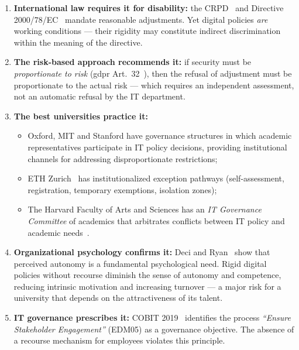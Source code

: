 \begin{enumerate}
    \item \textbf{International law requires it for disability:}
    the CRPD~\cite{un-crpd} and Directive 2000/78/EC~\cite{directive-2000-78}
    mandate reasonable adjustments. Yet digital policies
    \emph{are} working conditions --- their rigidity may constitute
    indirect discrimination within the meaning of the directive.

    \item \textbf{The risk-based approach recommends it:}
    if security must be \emph{proportionate to risk}
    (\gls{gdpr} Art.~32~\cite{gdpr}), then the refusal of adjustment must be
    proportionate to the actual risk --- which requires an independent
    assessment, not an automatic refusal by the IT department.

    \item \textbf{The best universities practice it:}
    \begin{itemize}[nosep]
        \item Oxford, MIT and Stanford have governance structures in which
        academic representatives participate in IT policy decisions,
        providing institutional channels for addressing disproportionate
        restrictions;
        \item ETH Zurich~\cite{eth-baseline} has institutionalized
        exception pathways (self-assessment, registration, temporary
        exemptions, isolation zones);
        \item The Harvard Faculty of Arts and Sciences has an
        \emph{IT Governance Committee} of academics that arbitrates
        conflicts between IT policy and academic
        needs~\cite{harvard-it-governance}.
    \end{itemize}

    \item \textbf{Organizational psychology confirms it:}
    Deci and Ryan~\cite{deci-ryan-sdt} show that perceived autonomy
    is a fundamental psychological need. Rigid digital policies
    without recourse diminish the sense of autonomy and
    competence, reducing intrinsic motivation and increasing
    turnover --- a major risk for a university that depends on
    the attractiveness of its talent.

    \item \textbf{IT governance prescribes it:}
    COBIT 2019~\cite{cobit} identifies the process
    \emph{``Ensure Stakeholder Engagement''} (EDM05) as a governance
    objective. The absence of a recourse mechanism for
    employees violates this principle.
\end{enumerate}

